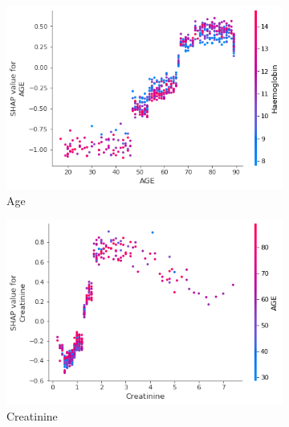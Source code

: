 \documentclass[12pt]{article}
\begin{document}
\begin{figure}[H]
     \centering
     \begin{subfigure}[b]{0.47\textwidth}
         \centering
         \includegraphics[width=\linewidth]{TreeExplainer Admission1 Global/TreeExplainer Admission1 Global for AGE.png}
         \caption{Age}
     \end{subfigure}
     \hfill
     \begin{subfigure}[b]{0.47\textwidth}
         \centering
         \includegraphics[width=\linewidth]{TreeExplainer Admission1 Global/TreeExplainer Admission1 Global for Creatinine.png}
         \caption{Creatinine}
     \end{subfigure}
     \hfill
     \begin{subfigure}[b]{0.47\textwidth}
         \centering

\end{subfigure}
\end{figure}
\end{document}

